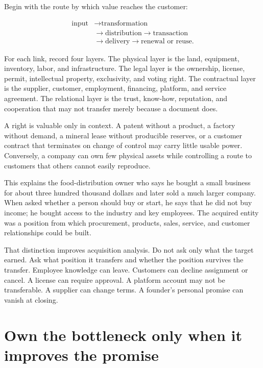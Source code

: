 Begin with the route by which value reaches the customer:

\begin{equation}
\begin{aligned}
\text{input}&\longrightarrow\text{transformation}\\
&\longrightarrow\text{distribution}\longrightarrow\text{transaction}\\
&\longrightarrow\text{delivery}\longrightarrow\text{renewal or reuse}.
\end{aligned}
\end{equation}

For each link, record four layers. The physical layer is the land, equipment,
inventory, labor, and infrastructure. The legal layer is the ownership,
license, permit, intellectual property, exclusivity, and voting right. The
contractual layer is the supplier, customer, employment, financing, platform,
and service agreement. The relational layer is the trust, know-how, reputation,
and cooperation that may not transfer merely because a document does.

A right is valuable only in context. A patent without a product, a factory
without demand, a mineral lease without producible reserves, or a customer
contract that terminates on change of control may carry little usable power.
Conversely, a company can own few physical assets while controlling a route to
customers that others cannot easily reproduce.

This explains the food-distribution owner who says he bought a small business
for about three hundred thousand dollars and later sold a much larger company.
When asked whether a person should buy or start, he says that he did not buy
income; he bought access to the industry and key employees. The acquired entity
was a position from which procurement, products, sales, service, and customer
relationships could be built.

That distinction improves acquisition analysis. Do not ask only what the
target earned. Ask what position it transfers and whether the position survives
the transfer. Employee knowledge can leave. Customers can decline assignment
or cancel. A license can require approval. A platform account may not be
transferable. A supplier can change terms. A founder's personal promise can
vanish at closing.

\section{Own the bottleneck only when it improves the promise}

